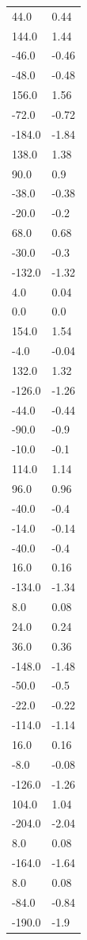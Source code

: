 \begin{longtable}{ll}
44.0 & 0.44 \\
144.0 & 1.44 \\
-46.0 & -0.46 \\
-48.0 & -0.48 \\
156.0 & 1.56 \\
-72.0 & -0.72 \\
-184.0 & -1.84 \\
138.0 & 1.38 \\
90.0 & 0.9 \\
-38.0 & -0.38 \\
-20.0 & -0.2 \\
68.0 & 0.68 \\
-30.0 & -0.3 \\
-132.0 & -1.32 \\
4.0 & 0.04 \\
0.0 & 0.0 \\
154.0 & 1.54 \\
-4.0 & -0.04 \\
132.0 & 1.32 \\
-126.0 & -1.26 \\
-44.0 & -0.44 \\
-90.0 & -0.9 \\
-10.0 & -0.1 \\
114.0 & 1.14 \\
96.0 & 0.96 \\
-40.0 & -0.4 \\
-14.0 & -0.14 \\
-40.0 & -0.4 \\
16.0 & 0.16 \\
-134.0 & -1.34 \\
8.0 & 0.08 \\
24.0 & 0.24 \\
36.0 & 0.36 \\
-148.0 & -1.48 \\
-50.0 & -0.5 \\
-22.0 & -0.22 \\
-114.0 & -1.14 \\
16.0 & 0.16 \\
-8.0 & -0.08 \\
-126.0 & -1.26 \\
104.0 & 1.04 \\
-204.0 & -2.04 \\
8.0 & 0.08 \\
-164.0 & -1.64 \\
8.0 & 0.08 \\
-84.0 & -0.84 \\
-190.0 & -1.9 \\

\end{longtable}
